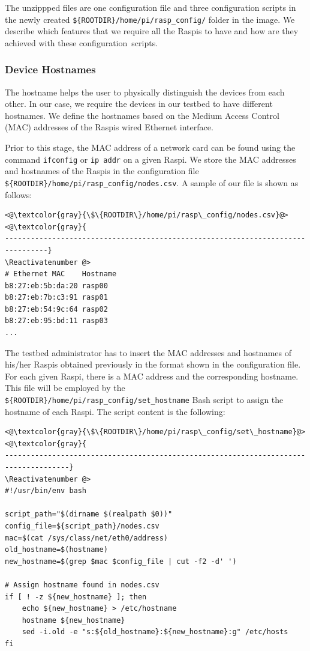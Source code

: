 \documentclass[electronics,article,accept,moreauthors,pdftex,10pt,a4paper]{mdpi}
\theoremstyle{mdpi}
\newcounter{ex}
\newcounter{re}
\theoremstyle{mdpidefinition}
\begin{document}
The unzippped files are one configuration file and three configuration
scripts in the newly created \texttt{\$\{ROOTDIR\}/home/pi/rasp\_config/}
folder in the image. We describe which features that we
require all the Raspis to have and how are they achieved with
these configuration~scripts.

\subsubsection{Device Hostnames}
The hostname helps the user to physically distinguish the
devices from each other. In our case, we require the devices in our
testbed to have different hostnames. We define the hostnames based
on the Medium Access Control (MAC) addresses of the Raspis wired Ethernet interface.

Prior to this stage, the MAC address of a network card can be found
using the command \texttt{ifconfig} or \texttt{ip addr} on a given
Raspi. We store the MAC addresses and hostnames of the
Raspis in the configuration file
\texttt{\$\{ROOTDIR\}/home/pi/rasp\_config/nodes.csv}. A sample of our file
is shown as follows:

\Suppressnumber\begin{lstlisting}[]
<@\textcolor{gray}{\$\{ROOTDIR\}/home/pi/rasp\_config/nodes.csv}@>
<@\textcolor{gray}{
--------------------------------------------------------------------------------}
\Reactivatenumber @>
# Ethernet MAC    Hostname
b8:27:eb:5b:da:20 rasp00
b8:27:eb:7b:c3:91 rasp01
b8:27:eb:54:9c:64 rasp02
b8:27:eb:95:bd:11 rasp03
...
\end{lstlisting}
\FloatBarrier
\vspace{-5mm}

The testbed administrator has to insert the MAC addresses and hostnames
of his/her Raspis obtained previously in the format shown in the
configuration file. For each given Raspi, there is a MAC address and
the corresponding hostname. This file will be employed by the
\texttt{\$\{ROOTDIR\}/home/pi/rasp\_config/set\_hostname} \ac{Bash} script to
assign the hostname of each Raspi. The script content is the following:

\Suppressnumber\begin{lstlisting}[]
<@\textcolor{gray}{\$\{ROOTDIR\}/home/pi/rasp\_config/set\_hostname}@>
<@\textcolor{gray}{
-------------------------------------------------------------------------------------}
\Reactivatenumber @>
#!/usr/bin/env bash

script_path="$(dirname $(realpath $0))"
config_file=${script_path}/nodes.csv
mac=$(cat /sys/class/net/eth0/address)
old_hostname=$(hostname)
new_hostname=$(grep $mac $config_file | cut -f2 -d' ')

# Assign hostname found in nodes.csv
if [ ! -z ${new_hostname} ]; then
    echo ${new_hostname} > /etc/hostname
    hostname ${new_hostname}
    sed -i.old -e "s:${old_hostname}:${new_hostname}:g" /etc/hosts
fi
\end{lstlisting}
\FloatBarrier
\vspace{-5mm}
\end{document}
